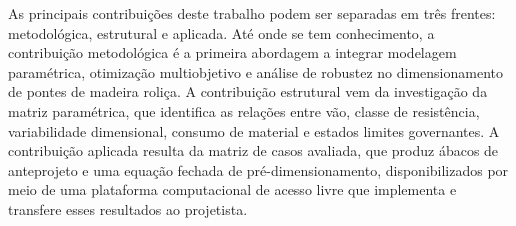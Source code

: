 As principais contribuições deste trabalho podem ser separadas em três frentes: metodológica, estrutural e aplicada. Até onde se tem conhecimento, a contribuição metodológica é a primeira abordagem a integrar modelagem paramétrica, otimização multiobjetivo e análise de robustez no dimensionamento de pontes de madeira roliça. A contribuição estrutural vem da investigação da matriz paramétrica, que identifica as relações entre vão, classe de resistência, variabilidade dimensional, consumo de material e estados limites governantes. A contribuição aplicada resulta da matriz de casos avaliada, que produz ábacos de anteprojeto e uma equação fechada de pré-dimensionamento, disponibilizados por meio de uma plataforma computacional de acesso livre que implementa e transfere esses resultados ao projetista.
